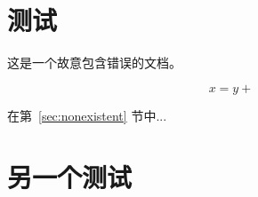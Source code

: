 \documentclass[12pt,a4paper]{article}
\begin{document}
\section{测试}
这是一个故意包含错误的文档。


\begin{equation}
    x = y +
\end{equation}

在第~\ref{sec:nonexistent} 节中...

\section{另一个测试}
\end{document}
